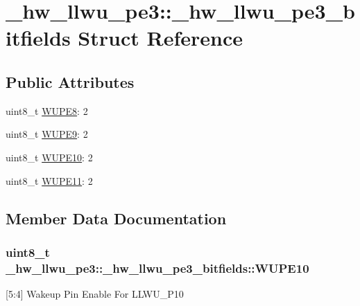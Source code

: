 \hypertarget{struct__hw__llwu__pe3_1_1__hw__llwu__pe3__bitfields}{}\section{\+\_\+hw\+\_\+llwu\+\_\+pe3\+:\+:\+\_\+hw\+\_\+llwu\+\_\+pe3\+\_\+bitfields Struct Reference}
\label{struct__hw__llwu__pe3_1_1__hw__llwu__pe3__bitfields}
\subsection*{Public Attributes}
\begin{DoxyCompactItemize}
\item 
uint8\+\_\+t \hyperlink{struct__hw__llwu__pe3_1_1__hw__llwu__pe3__bitfields_a7053f3489594321e08a9a05dbf66ec4a}{W\+U\+P\+E8}\+: 2
\item 
uint8\+\_\+t \hyperlink{struct__hw__llwu__pe3_1_1__hw__llwu__pe3__bitfields_a5d9eaa15f46674d331e5aa21344b5544}{W\+U\+P\+E9}\+: 2
\item 
uint8\+\_\+t \hyperlink{struct__hw__llwu__pe3_1_1__hw__llwu__pe3__bitfields_abc40668b0b1c154b5e3b2fe699f9e842}{W\+U\+P\+E10}\+: 2
\item 
uint8\+\_\+t \hyperlink{struct__hw__llwu__pe3_1_1__hw__llwu__pe3__bitfields_ae95bb26546bfa7807a2504c87d960767}{W\+U\+P\+E11}\+: 2
\end{DoxyCompactItemize}


\subsection{Member Data Documentation}
\subsubsection[{\texorpdfstring{W\+U\+P\+E10}{WUPE10}}]{\setlength{\rightskip}{0pt plus 5cm}uint8\+\_\+t \+\_\+hw\+\_\+llwu\+\_\+pe3\+::\+\_\+hw\+\_\+llwu\+\_\+pe3\+\_\+bitfields\+::\+W\+U\+P\+E10}\hypertarget{struct__hw__llwu__pe3_1_1__hw__llwu__pe3__bitfields_abc40668b0b1c154b5e3b2fe699f9e842}{}\label{struct__hw__llwu__pe3_1_1__hw__llwu__pe3__bitfields_abc40668b0b1c154b5e3b2fe699f9e842}
\mbox{[}5\+:4\mbox{]} Wakeup Pin Enable For L\+L\+W\+U\+\_\+\+P10 
